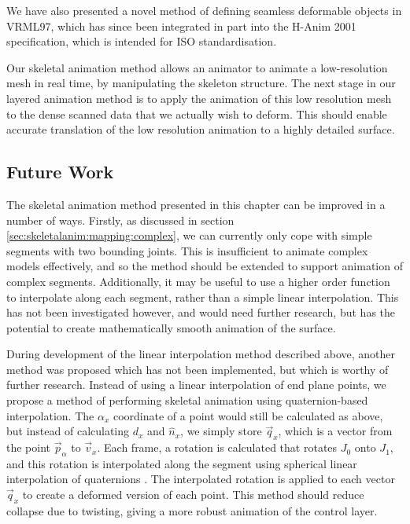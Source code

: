 We have also presented a novel method of defining seamless deformable objects in VRML97, which has since been integrated in part into the H-Anim 2001 specification, which is intended for ISO standardisation.

Our skeletal animation method allows an animator to animate a low-resolution mesh in real time, by manipulating the skeleton structure. The next stage in our layered animation method is to apply the animation of this low resolution mesh to the dense scanned data that we actually wish to deform. This should enable accurate translation of the low resolution animation to a highly detailed surface.

\subsection{\label{sec:skeletalanim:conclusion:future}Future Work}

The skeletal animation method presented in this chapter can be improved in a number of ways. Firstly, as discussed in section \ref{sec:skeletalanim:mapping:complex}, we can currently only cope with simple segments with two bounding joints. This is insufficient to animate complex models effectively, and so the method should be extended to support animation of complex segments. Additionally, it may be useful to use a higher order function to interpolate along each segment, rather than a simple linear interpolation. This has not been investigated however, and would need further research, but has the potential to create mathematically smooth animation of the surface.

During development of the linear interpolation method described above, another method was proposed which has not been implemented, but which is worthy of further research. Instead of using a linear interpolation of end plane points, we propose a method of performing skeletal animation using quaternion-based interpolation. The $\alpha_x$ coordinate of a point would still be calculated as above, but instead of calculating $d_x$ and $\hat{n}_x$, we simply store $\vec{q}_x$, which is a vector from the point $\vec{p}_\alpha$ to $\vec{v}_x$. Each frame, a rotation is calculated that rotates $J_0$ onto $J_1$, and this rotation is interpolated along the segment using spherical linear interpolation of quaternions \cite{Lengyel02}. The interpolated rotation is applied to each vector $\vec{q}_x$ to create a deformed version of each point. This method should reduce collapse due to twisting, giving a more robust animation of the control layer. 
